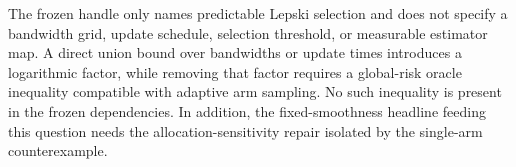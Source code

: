 The frozen handle only names predictable Lepski selection and does not specify a bandwidth grid, update schedule, selection threshold, or measurable estimator map.  A direct union bound over bandwidths or update times introduces a logarithmic factor, while removing that factor requires a global-risk oracle inequality compatible with adaptive arm sampling.  No such inequality is present in the frozen dependencies.  In addition, the fixed-smoothness headline feeding this question needs the allocation-sensitivity repair isolated by the single-arm counterexample.